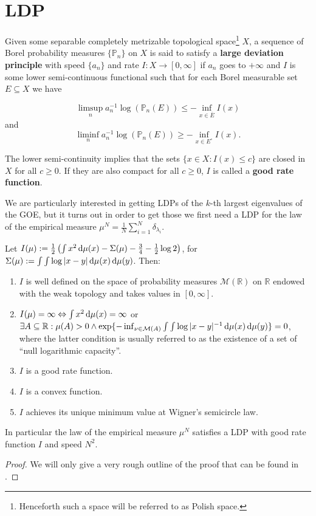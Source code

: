 \section{LDP}
\begin{definition}\label{def:LDP}
	Given some separable completely metrizable topological space\footnote{Henceforth such a space will be referred to as Polish space.} $X$, a sequence of Borel probability measures $\{\mathbb P_n\}$ on $X$ is said to satisfy a \textbf{large deviation principle} with speed $\{a_n\}$ and rate $I:X\rightarrow [0,\infty]$ if $a_n$ goes to $+\infty$ and $I$ is some lower semi-continuous functional such that for each Borel measurable set $E\subseteq X$ we have
	
	$$\limsup_n a_n^{-1}\log(\mathbb P_n(E))\leq -\inf_{x\in \overline E}I(x)$$
	and
	$$\liminf_n a_n^{-1}\log(\mathbb P_n(E))\geq -\inf_{x\in E^\circ}I(x).$$
	
	The lower semi-continuity implies that the sets $\{x\in X: I(x)\leq c\}$ are closed in $X$ for all $c\geq 0$. If they are also compact for all $c\geq 0$, $I$ is called a \textbf{good rate function}.
\end{definition}

We are particularly interested in getting LDPs of the $k$-th largest eigenvalues of the GOE, but it turns out in order to get those we first need a LDP for the law of the empirical measure $\mu^N=\frac{1}{N}\sum_{i=1}^N\delta_{\lambda_i}$.

\begin{theorem}
	Let $I(\mu):=\frac{1}{2}\left(\int x^2\mathop{}\!\mathrm{d}\mu(x) - \Sigma(\mu) - \frac{3}{4}-\frac{1}{2}\log 2 \right)$, for $\Sigma(\mu):=\int\int\log|x-y|\mathop{}\!\mathrm{d}\mu(x)\mathop{}\!\mathrm{d}\mu(y)$. Then:
	\begin{enumerate}
		\item $I$ is well defined on the space of probability measures $\mathcal M(\mathbb{R})$ on $\mathbb{R}$ endowed with the weak topology and takes values in $[0,\infty]$.
		\item $I(\mu)=\infty \Leftrightarrow \int x^2\mathop{}\!\mathrm{d}\mu(x)=\infty$ or $\exists A\subseteq\mathbb R: \mu(A)>0 \land \exp\{-\inf_{\nu\in\mathcal M(A)}\int\int \log|x-y|^{-1}\mathop{}\!\mathrm{d}\mu(x)\mathop{}\!\mathrm{d}\mu(y)\}=0$, where the latter condition is usually referred to as the existence of a set of ``null logarithmic capacity''.
		\item $I$ is a good rate function.
		\item $I$ is a convex function.
		\item $I$ achieves its unique minimum value at Wigner's semicircle law.
	\end{enumerate}
	In particular the law of the empirical measure $\mu^N$ satisfies a LDP with good rate function $I$ and speed $N^2$.
\end{theorem}
\begin{proof}
	We will only give a very rough outline of the proof that can be found in \cite{ArousLDPforWSL}. 
	
\end{proof}

